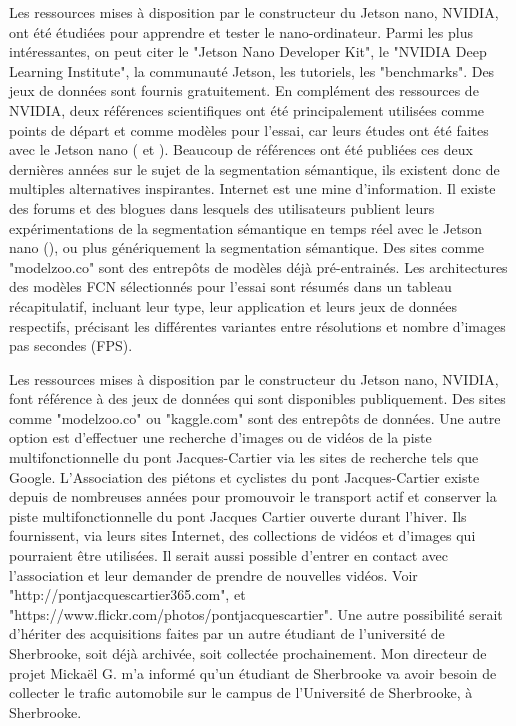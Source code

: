 \par 

Les ressources mises à disposition par le constructeur du Jetson nano, NVIDIA, ont été étudiées pour apprendre et tester le nano-ordinateur. Parmi les plus intéressantes, on peut citer le "Jetson Nano Developer Kit", le "NVIDIA Deep Learning Institute", la communauté Jetson, les tutoriels, les "benchmarks". Des jeux de données sont fournis gratuitement.
En complément des ressources de NVIDIA, deux références scientifiques ont été principalement utilisées comme points de départ et comme modèles pour l'essai, car leurs études ont été faites avec le Jetson nano (\cite{nguyen_mavnet_2019} et \cite{chong_real-time_1992}). Beaucoup de références ont été publiées ces deux dernières années sur le sujet de la segmentation sémantique, ils existent donc de multiples alternatives inspirantes.
Internet est une mine d'information. Il existe des forums et des blogues dans lesquels des utilisateurs publient leurs expérimentations de la segmentation sémantique en temps réel avec le Jetson nano (\cite{dustin_realtime_2019}), ou plus génériquement la segmentation sémantique. Des sites comme "modelzoo.co" sont des entrepôts de modèles déjà pré-entrainés. 
Les architectures des modèles FCN sélectionnés pour l'essai sont résumés dans un tableau récapitulatif, incluant leur type, leur application et leurs jeux de données respectifs, précisant les différentes variantes entre résolutions et nombre d'images pas secondes (FPS).

Les ressources mises à disposition par le constructeur du Jetson nano, NVIDIA, font référence à des jeux de données qui sont disponibles publiquement.
Des sites comme "modelzoo.co" ou "kaggle.com" sont des entrepôts de données. Une autre option est d'effectuer une recherche d'images ou de vidéos de la piste multifonctionnelle du pont Jacques-Cartier via les sites de recherche tels que Google. 
L'Association des piétons et cyclistes du pont Jacques-Cartier existe depuis de nombreuses années pour promouvoir le transport actif et conserver la piste multifonctionnelle du pont Jacques Cartier ouverte durant l'hiver. Ils fournissent, via leurs sites Internet, des collections de vidéos et d'images qui pourraient être utilisées. Il serait aussi possible d'entrer en contact avec l'association et leur demander de prendre de nouvelles vidéos. Voir "http://pontjacquescartier365.com", et\\"https://www.flickr.com/photos/pontjacquescartier".
Une autre possibilité serait d'hériter des acquisitions faites par un autre étudiant de l'université de Sherbrooke, soit déjà archivée, soit collectée prochainement. Mon directeur de projet Mickaël G. m'a informé qu'un étudiant de Sherbrooke va avoir besoin de collecter le trafic automobile sur le campus de l'Université de Sherbrooke, à Sherbrooke.
\vspace{1\baselineskip}
\par 